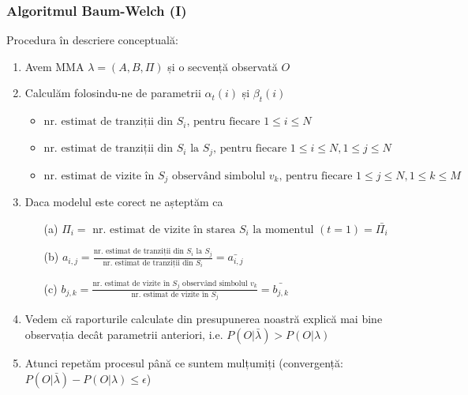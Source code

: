 \begin{frame}[fragile, t]
	\frametitle{Algoritmul Baum-Welch (I)}
	Procedura în descriere conceptuală:	
	\vspace*{0.5em}
	\footnotesize{
	\begin{enumerate}
		\item Avem MMA $\lambda = (A, B, \Pi)$ și o secvență observată $O$
		\pause
		
		\item Calculăm folosindu-ne de parametrii $\alpha_t(i)$ și $\beta_t(i)$
			\begin{itemize}
				\item	$\mbox{nr. estimat de tranziții din } S_i \mbox{, pentru fiecare } 1 \le i \le N$
				\vspace*{0.5em}
				\item	$\mbox{nr. estimat de tranziții din } S_i \mbox{ la } S_j 
						\mbox{, pentru fiecare } 1 \le i \le N, 1 \le j \le N$
				\vspace*{0.5em}
				\item 	$\mbox{nr. estimat de vizite în } S_j \mbox{ observând simbolul } v_k
						\mbox{, pentru fiecare } 1 \le j \le N, 1 \le k \le M$
			\end{itemize}
		\pause
		
		\item Daca modelul este corect ne așteptăm ca
			\begin{enumerate}
				\item[(a)] $\Pi_i = \mbox{ nr. estimat de vizite în starea } 
													S_i \mbox{ la momentul } (t=1) = \bar{\Pi_i} $
				\vspace*{0.5em}
				\item[(b)] $a_{i,j} = \frac{\mbox{nr. estimat de tranziții din } S_i \mbox{ la } S_j}
											{\mbox{nr. estimat de tranziții din } S_i} = \bar{a_{i,j}} $
				\vspace*{0.5em}
				\item[(c)] $b_{j,k} = \frac{\mbox{nr. estimat de vizite în } S_j \mbox{ observând simbolul } v_k}
											{\mbox{nr. estimat de vizite în } S_j} = \bar{b_{j,k}} $
			\end{enumerate}
		\pause
		
		\item Vedem că raporturile calculate din presupunerea noastră explică mai bine observația decât parametrii
				anteriori, i.e. $P(O \vert \bar{\lambda}) > P(O \vert \lambda) $
		\pause
		\item Atunci repetăm procesul până ce suntem mulțumiți (convergență: 
				$P(O \vert \bar{\lambda}) - P(O \vert \lambda) \le \epsilon$)
	\end{enumerate}
	}
\end{frame}

